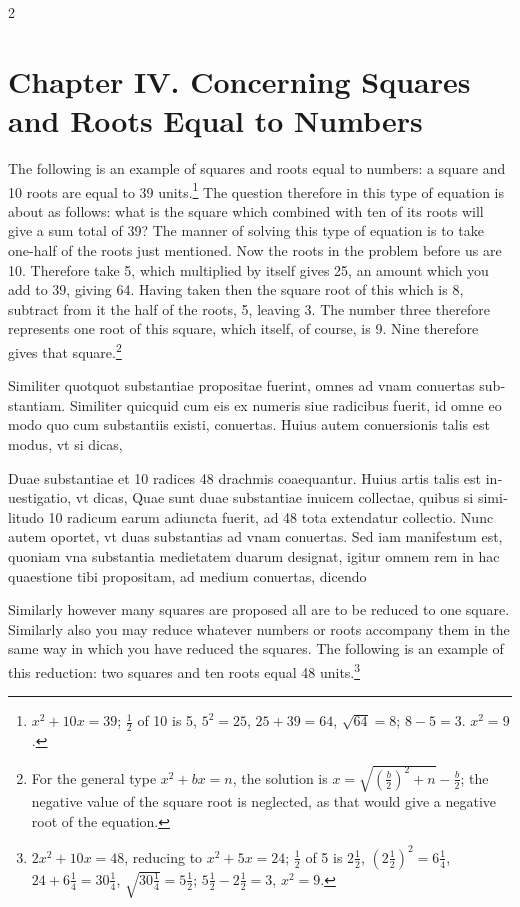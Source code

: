 \documentclass[11pt,a4paper,twoside]{book}
\newcommand{\latincolumn}[1]{\textlatin{\small #1}}
\begin{document}
\begin{paracol}{2}
\switchcolumn

\section*{Chapter IV. Concerning Squares and Roots Equal to Numbers}

The following is an example of squares and roots equal to numbers: a square and 10 roots are equal to 39 units.\footnote{$x^2 + 10x = 39$; $\frac{1}{2}$ of 10 is 5, $5^2 = 25$, $25 + 39 = 64$, $\sqrt{64} = 8$; $8 - 5 = 3$. $x^2 = 9$.} The question therefore in this type of equation is about as follows: what is the square which combined with ten of its roots will give a sum total of 39? The manner of solving this type of equation is to take one-half of the roots just mentioned. Now the roots in the problem before us are 10. Therefore take 5, which multiplied by itself gives 25, an amount which you add to 39, giving 64. Having taken then the square root of this which is 8, subtract from it the half of the roots, 5, leaving 3. The number three therefore represents one root of this square, which itself, of course, is 9. Nine therefore gives that square.\footnote{For the general type $x^2 + bx = n$, the solution is $x = \sqrt{(\frac{b}{2})^2 + n} - \frac{b}{2}$; the negative value of the square root is neglected, as that would give a negative root of the equation.}

\switchcolumn*

\latincolumn{Similiter quotquot substantiae propositae fuerint, omnes ad vnam conuertas substantiam. Similiter quicquid cum eis ex numeris siue radicibus fuerit, id omne eo modo quo cum substantiis existi, conuertas. Huius autem conuersionis talis est modus, vt si dicas,}

\medskip

\latincolumn{Duae substantiae et 10 radices 48 drachmis coaequantur. Huius artis talis est inuestigatio, vt dicas, Quae sunt duae substantiae inuicem collectae, quibus si similitudo 10 radicum earum adiuncta fuerit, ad 48 tota extendatur collectio. Nunc autem oportet, vt duas substantias ad vnam conuertas. Sed iam manifestum est, quoniam vna substantia medietatem duarum designat, igitur omnem rem in hac quaestione tibi propositam, ad medium conuertas, dicendo}

\switchcolumn

Similarly however many squares are proposed all are to be reduced to one square. Similarly also you may reduce whatever numbers or roots accompany them in the same way in which you have reduced the squares. The following is an example of this reduction: two squares and ten roots equal 48 units.\footnote{$2x^2 + 10x = 48$, reducing to $x^2 + 5x = 24$; $\frac{1}{2}$ of 5 is $2\frac{1}{2}$, $(2\frac{1}{2})^2 = 6\frac{1}{4}$, $24 + 6\frac{1}{4} = 30\frac{1}{4}$, $\sqrt{30\frac{1}{4}} = 5\frac{1}{2}$; $5\frac{1}{2} - 2\frac{1}{2} = 3$, $x^2 = 9$.}


\end{paracol}
\end{document}
